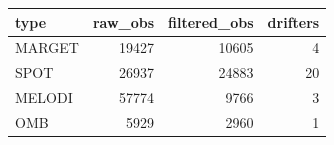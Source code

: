 \begin{tabular}{lrrr}
\toprule
type & raw_obs & filtered_obs & drifters \\
\midrule
MARGET & 19427 & 10605 & 4 \\
SPOT & 26937 & 24883 & 20 \\
MELODI & 57774 & 9766 & 3 \\
OMB & 5929 & 2960 & 1 \\
\bottomrule
\end{tabular}
